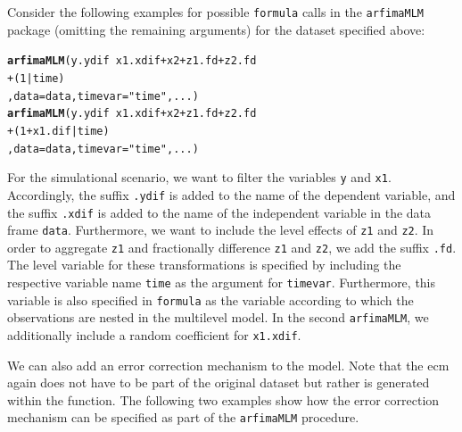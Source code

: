 \documentclass[12pt]{paper}\usepackage[]{graphicx}\usepackage[]{color}
\makeatletter
\newcommand{\hlnum}[1]{\textcolor[rgb]{0.686,0.059,0.569}{#1}}%
\newcommand{\hlstr}[1]{\textcolor[rgb]{0.192,0.494,0.8}{#1}}%
\newcommand{\hlopt}[1]{\textcolor[rgb]{0,0,0}{#1}}%
\newcommand{\hlstd}[1]{\textcolor[rgb]{0.345,0.345,0.345}{#1}}%
\newcommand{\hlkwc}[1]{\textcolor[rgb]{0.333,0.667,0.333}{#1}}%
\newcommand{\hlkwd}[1]{\textcolor[rgb]{0.737,0.353,0.396}{\textbf{#1}}}%
\newenvironment{kframe}{%
 \def\at@end@of@kframe{}%
 \ifinner\ifhmode%
  \def\at@end@of@kframe{\end{minipage}}%
  \begin{minipage}{\columnwidth}%
 \fi\fi%
 \def\FrameCommand##1{\hskip\@totalleftmargin \hskip-\fboxsep
 \colorbox{shadecolor}{##1}\hskip-\fboxsep
     \hskip-\linewidth \hskip-\@totalleftmargin \hskip\columnwidth}%
 \MakeFramed {\advance\hsize-\width
   \@totalleftmargin\z@ \linewidth\hsize
   \@setminipage}}%
 {\par\unskip\endMakeFramed%
 \at@end@of@kframe}
\newenvironment{knitrout}{}{} %
\makeatother
\begin{document}
Consider the following examples for possible \texttt{formula} calls in the \texttt{arfimaMLM} package (omitting the remaining arguments) for the dataset specified above:

\begin{knitrout}
\color{fgcolor}\begin{kframe}
\begin{alltt}
\hlkwd{arfimaMLM}\hlstd{(y.ydif} \hlopt{~} \hlstd{x1.xdif} \hlopt{+} \hlstd{x2} \hlopt{+} \hlstd{z1.fd} \hlopt{+} \hlstd{z2.fd}
          \hlopt{+} \hlstd{(}\hlnum{1}\hlopt{|}\hlstd{time)}
          \hlstd{,} \hlkwc{data}\hlstd{=data,} \hlkwc{timevar} \hlstd{=} \hlstr{"time"}\hlstd{, ...)}
\hlkwd{arfimaMLM}\hlstd{(y.ydif} \hlopt{~} \hlstd{x1.xdif} \hlopt{+} \hlstd{x2} \hlopt{+} \hlstd{z1.fd} \hlopt{+} \hlstd{z2.fd}
          \hlopt{+} \hlstd{(}\hlnum{1}\hlopt{+}\hlstd{x1.dif}\hlopt{|}\hlstd{time)}
          \hlstd{,} \hlkwc{data}\hlstd{=data,} \hlkwc{timevar} \hlstd{=} \hlstr{"time"}\hlstd{, ...)}
\end{alltt}
\end{kframe}
\end{knitrout}

For the simulational scenario, we want to filter the variables \texttt{y} and \texttt{x1}. Accordingly, the suffix \texttt{.ydif} is added to the name of the dependent variable, and the suffix \texttt{.xdif} is added to the name of the independent variable in the data frame \texttt{data}. Furthermore, we want to include the level effects of \texttt{z1} and \texttt{z2}. In order to aggregate \texttt{z1} and fractionally difference \texttt{z1} and \texttt{z2}, we add the suffix \texttt{.fd}. The level variable for these transformations is specified by including the respective variable name \texttt{time} as the argument for \texttt{timevar}. Furthermore, this variable is also specified in \texttt{formula} as the variable according to which the observations are nested in the multilevel model. In the second \texttt{arfimaMLM}, we additionally include a random coefficient for \texttt{x1.xdif}.

We can also add an error correction mechanism to the model. Note that the ecm again does not have to be part of the original dataset but rather is generated within the function. The following two examples show how the error correction mechanism can be specified as part of the \texttt{arfimaMLM} procedure.
\end{document}
